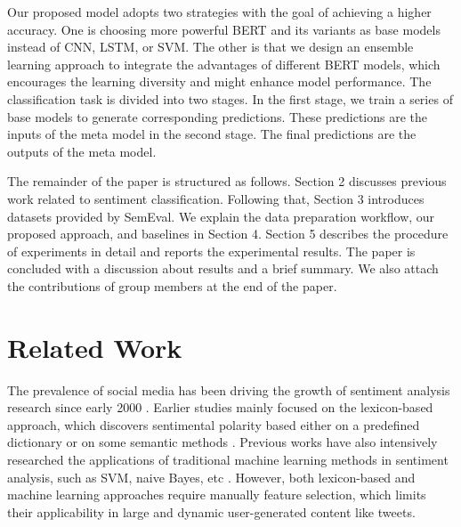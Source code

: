 \documentclass[runningheads]{llncs}
\begin{document}
Our proposed model adopts two strategies with the goal of achieving a higher accuracy. One is choosing more powerful BERT and its variants as base models instead of CNN, LSTM, or SVM. The other is that we design an ensemble learning approach to integrate the advantages of different BERT models, which encourages the learning diversity and might enhance model performance. The classification task is divided into two stages. In the first stage, we train a series of base models to generate corresponding predictions. These predictions are the inputs of the meta model in the second stage. The final predictions are the outputs of the meta model.

The remainder of the paper is structured as follows. Section 2 discusses previous work related to sentiment classification. Following that, Section 3 introduces datasets provided by SemEval. We explain the data preparation workflow, our proposed approach, and baselines in Section 4. Section 5 describes the procedure of experiments in detail and reports the experimental results. The paper is concluded with a discussion about results and a brief summary. We also attach the contributions of group members at the end of the paper. 

\section{Related Work}
The prevalence of social media has been driving the growth of sentiment analysis research since early 2000 \cite{2018sa}. Earlier studies mainly focused on the lexicon-based approach, which discovers sentimental polarity based either on a predefined dictionary or on some semantic methods \cite{2014sa}. Previous works have also intensively researched the applications of traditional machine learning methods in sentiment analysis, such as SVM, naive Bayes, etc \cite{2019sa}. However, both lexicon-based and machine learning approaches require manually feature selection, which limits their applicability in large and dynamic user-generated content like tweets.
\end{document}
